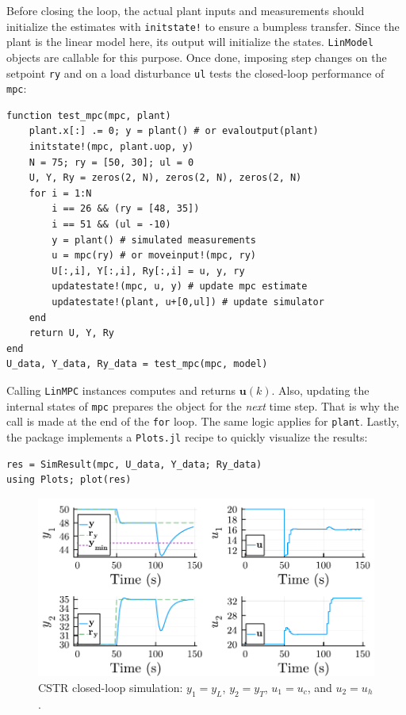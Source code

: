 Before closing the loop, the actual plant inputs and measurements should initialize the estimates with \texttt{initstate!} to ensure a bumpless transfer. Since the plant is the linear model here, its output will initialize the states. \texttt{LinModel} objects are callable for this purpose. Once done, imposing step changes on the setpoint \texttt{ry} and on a load disturbance \texttt{ul} tests the closed-loop performance of \texttt{mpc}:
\begin{verbatim}
function test_mpc(mpc, plant)
    plant.x[:] .= 0; y = plant() # or evaloutput(plant)
    initstate!(mpc, plant.uop, y)
    N = 75; ry = [50, 30]; ul = 0
    U, Y, Ry = zeros(2, N), zeros(2, N), zeros(2, N)
    for i = 1:N
        i == 26 && (ry = [48, 35])
        i == 51 && (ul = -10)
        y = plant() # simulated measurements
        u = mpc(ry) # or moveinput!(mpc, ry)
        U[:,i], Y[:,i], Ry[:,i] = u, y, ry
        updatestate!(mpc, u, y) # update mpc estimate
        updatestate!(plant, u+[0,ul]) # update simulator
    end
    return U, Y, Ry
end
U_data, Y_data, Ry_data = test_mpc(mpc, model)
\end{verbatim}
Calling \texttt{LinMPC} instances computes and returns $\mathbf{u}(k)$. Also, updating the internal states of \texttt{mpc} prepares the object for the \emph{next} time step. That is why the call is made at the end of the \texttt{for} loop. The same logic applies for \texttt{plant}. Lastly, the package implements a \texttt{Plots.jl} recipe \citep{plots} to quickly visualize the results:
\begin{verbatim}
res = SimResult(mpc, U_data, Y_data; Ry_data)
using Plots; plot(res)
\end{verbatim}

\begin{figure}[t]
    \centering
    \includegraphics[width=\columnwidth]{fig/plot_LinMPC1.pdf}
    \caption{CSTR closed-loop simulation: $y_1=y_L$, $y_2=y_T$, $u_1=u_c$, and $u_2=u_h$.}
    \label{fig:plot_LinMPC1}
\end{figure}

